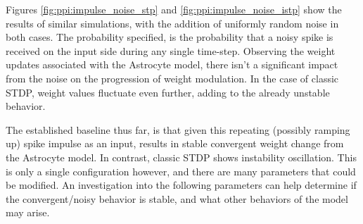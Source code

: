 


Figures \ref{fig:ppi:impulse_noise_stp} and \ref{fig:ppi:impulse_noise_istp}
show the results of similar simulations, with the addition of uniformly random
noise in both cases. The probability specified, is the probability that a noisy
spike is received on the input side during any single time-step. Observing the
weight updates associated with the Astrocyte model, there isn't a significant
impact from the noise on the progression of weight modulation. In the case of
classic STDP, weight values fluctuate even further, adding to the already
unstable behavior.



The established baseline thus far, is that given this repeating (possibly
ramping up) spike impulse as an input, results in stable convergent weight
change from the Astrocyte model. In contrast, classic STDP shows instability
oscillation. This is only a single configuration however, and there are many
parameters that could be modified. An investigation into the following
parameters can help determine if the convergent/noisy behavior is stable,
and what other behaviors of the model may arise.

